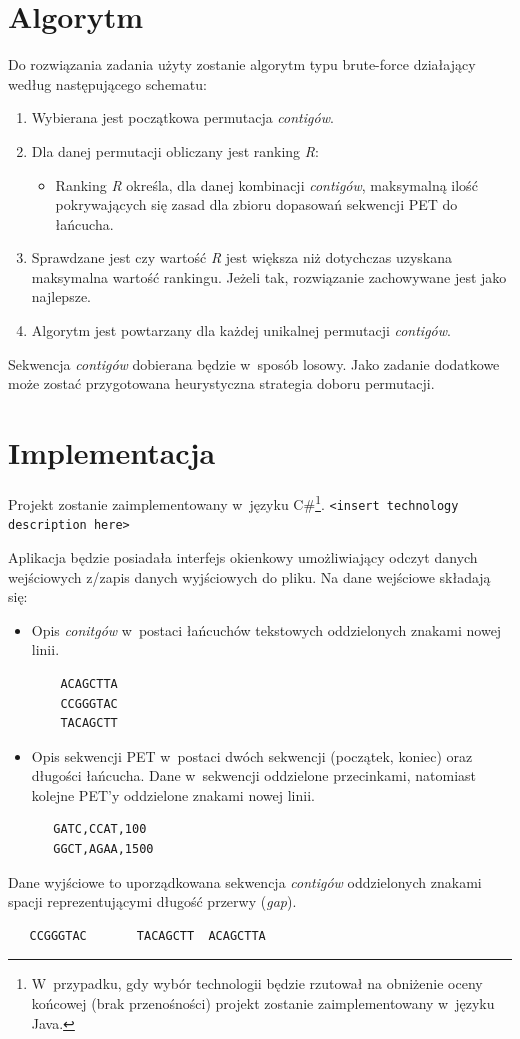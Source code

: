 \documentclass[a4paper,10pt]{article}
\begin{document}
\section*{Algorytm}

Do rozwiązania zadania użyty zostanie algorytm typu brute-force działający według następującego schematu:

\begin{enumerate}
 \item Wybierana jest początkowa permutacja \emph{contigów}.
 \item Dla danej permutacji obliczany jest ranking \emph{R}:
   \begin{itemize}
    \item Ranking \emph{R} określa, dla danej kombinacji \emph{contigów}, maksymalną ilość pokrywających się zasad dla zbioru dopasowań sekwencji PET do łańcucha.
   \end{itemize}
 \item Sprawdzane jest czy wartość \emph{R} jest większa niż dotychczas uzyskana maksymalna wartość rankingu. Jeżeli tak, rozwiązanie zachowywane jest jako najlepsze.
 \item Algorytm jest powtarzany dla każdej unikalnej permutacji \emph{contigów}.
\end{enumerate}

Sekwencja \emph{contigów} dobierana będzie w~sposób losowy. Jako zadanie dodatkowe może zostać przygotowana heurystyczna strategia doboru permutacji.
 
\section*{Implementacja}

Projekt zostanie zaimplementowany w~języku C\#\footnote{W~przypadku, gdy wybór technologii będzie rzutował na obniżenie oceny końcowej (brak przenośności) projekt zostanie zaimplementowany w~języku Java.}. \verb+<insert technology description here>+

Aplikacja będzie posiadała interfejs okienkowy umożliwiający odczyt danych wejściowych z/zapis danych wyjściowych do pliku. Na dane wejściowe składają się:

\begin{itemize}
 \item Opis \emph{conitgów} w~postaci łańcuchów tekstowych oddzielonych znakami nowej linii.
 
  \begin{verbatim}
    ACAGCTTA
    CCGGGTAC
    TACAGCTT
  \end{verbatim}
  \item Opis sekwencji PET w~postaci dwóch sekwencji (początek, koniec) oraz długości łańcucha. Dane w~sekwencji oddzielone przecinkami, natomiast kolejne PET'y oddzielone znakami nowej linii.
  
  \begin{verbatim}
   GATC,CCAT,100
   GGCT,AGAA,1500
  \end{verbatim}
\end{itemize}

Dane wyjściowe to uporządkowana sekwencja \emph{contigów} oddzielonych znakami spacji reprezentującymi długość przerwy (\emph{gap}).

  \begin{verbatim}
   CCGGGTAC       TACAGCTT  ACAGCTTA
  \end{verbatim}
\end{document}
